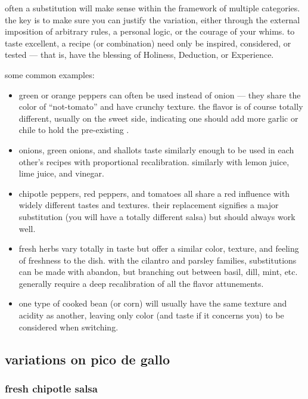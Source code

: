 often a substitution will make sense within the framework of multiple
categories. the key is to make sure you can justify the variation,
either through the external imposition of arbitrary rules, a personal
logic, or the courage of your whims. to taste excellent, a recipe (or
combination) need only be inspired, considered, or tested --- that is,
have the blessing of Holiness, Deduction, or Experience.

some common examples:

\begin{itemize}
  \item green or orange peppers can often be used instead of onion ---
  they share the color of ``not-tomato'' and have crunchy texture. the
  flavor is of course totally different, usually on the sweet side,
  indicating one should add more garlic or chile to hold the
  pre-existing .

  \item onions, green onions, and shallots taste similarly enough to
  be used in each other's recipes with proportional
  recalibration. similarly with lemon juice, lime juice, and vinegar.

  \item chipotle peppers, red peppers, and tomatoes all share a red
  influence with widely different tastes and textures. their
  replacement signifies a major substitution (you will have a totally
  different salsa) but should always work well.

  \item fresh herbs vary totally in taste but offer a similar color,
  texture, and feeling of freshness to the dish. with the cilantro and
  parsley families, substitutions can be made with abandon, but
  branching out between basil, dill, mint, etc. generally require a
  deep recalibration of all the flavor attunements.

  \item one type of cooked bean (or corn) will usually have the same
  texture and acidity as another, leaving only color (and taste if it
  concerns you) to be considered when switching.
\end{itemize}

\subsection{variations on pico de gallo}

\subsubsection{fresh chipotle salsa}

